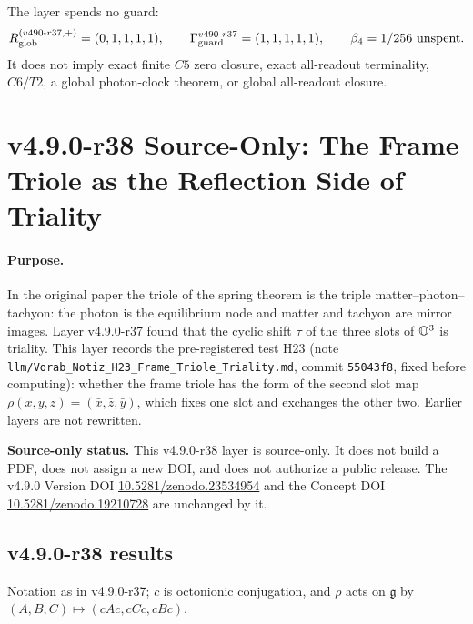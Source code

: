 The layer spends no guard:
\[
R_{\rm glob}^{(v490\text{-}r37,+)}=(0,1,1,1,1),
\qquad
\Gamma_{\rm guard}^{v490\text{-}r37}=(1,1,1,1,1),
\qquad
\beta_4=1/256\ \text{unspent}.
\]
It does not imply exact finite \(C5\) zero closure, exact all-readout terminality,
\(C6/T2\), a global photon-clock theorem, or global all-readout closure.
\clearpage
\section*{v4.9.0-r38 Source-Only: The Frame Triole as the Reflection Side of Triality}
\label{sec:v490-r38-frame-triole-triality}

\paragraph{Purpose.}
In the original paper the triole of the spring theorem is the triple matter--photon--tachyon: the photon is the equilibrium node
and matter and tachyon are mirror images.  Layer v4.9.0-r37 found that the cyclic shift \(\tau\) of the three slots of \(\mathbb{O}^3\) is
triality.  This layer records the pre-registered test H23 (note \texttt{llm/Vorab\_Notiz\_H23\_Frame\_Triole\_Triality.md}, commit
\texttt{55043f8}, fixed before computing): whether the frame triole has the form of the second slot map
\(\rho(x,y,z)=(\bar x,\bar z,\bar y)\), which fixes one slot and exchanges the other two.  Earlier layers are not rewritten.

\noindent\textbf{Source-only status.}
This v4.9.0-r38 layer is source-only.  It does not build a PDF, does not assign a new DOI,
and does not authorize a public release.  The v4.9.0 Version DOI
\href{https://doi.org/10.5281/zenodo.23534954}{10.5281/zenodo.23534954} and the Concept DOI
\href{https://doi.org/10.5281/zenodo.19210728}{10.5281/zenodo.19210728} are unchanged by it.

\subsection*{v4.9.0-r38 results}
\label{subsec:v490-r38-results}

Notation as in v4.9.0-r37; \(c\) is octonionic conjugation, and \(\rho\) acts on \(\mathfrak g\) by
\((A,B,C)\mapsto(cAc,cCc,cBc)\).

